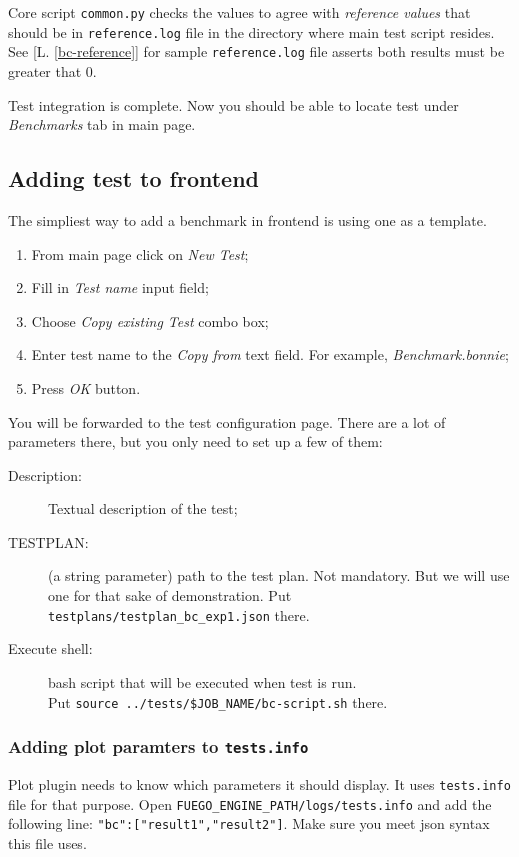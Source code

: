 Core script \texttt{common.py} checks the values to agree with \textit{reference values} that should be in \texttt{reference.log} file in the directory where main test script resides. See [L. \ref{bc-reference}] for sample \texttt{reference.log} file asserts both results must be greater that 0. 

Test integration is complete. Now you should be able to locate test under \textit{Benchmarks} tab in main page.

\subsection{Adding test to frontend}
\label{sec:test-add-frontend}

The simpliest way to add a benchmark in frontend is using one as a template.
\begin{enumerate}
\item From main page click on \textit{New Test};
\item Fill in \textit{Test name} input field;
\item Choose \textit{Copy existing Test} combo box;
\item Enter test name to the \textit{Copy from} text field. For example, \textit{Benchmark.bonnie};
\item Press \textit{OK} button.
\end{enumerate}

You will be forwarded to the test configuration page. There are a lot of parameters there, but you only need to set up a few of them:

\begin{description}
\item[Description:] Textual description of the test;
\item[TESTPLAN:] (a string parameter) path to the test plan. Not mandatory. But we will use one for that sake of demonstration.
  Put \texttt{testplans/testplan\_bc\_exp1.json} there.
\item[Execute shell:] bash script that will be executed when test is run. \\
  Put \texttt{source ../tests/\$JOB\_NAME/bc-script.sh} there.
\end{description}


\subsubsection{Adding plot paramters to \texttt{tests.info}}
\label{sec:edit-tst-info}
Plot plugin needs to know which parameters it should display. It uses \texttt{tests.info}
file for that purpose.
Open \texttt{FUEGO\_ENGINE\_PATH/logs/tests.info} and add the following line:
\texttt{"bc":["result1","result2"]}. Make sure you meet json syntax this file uses.


